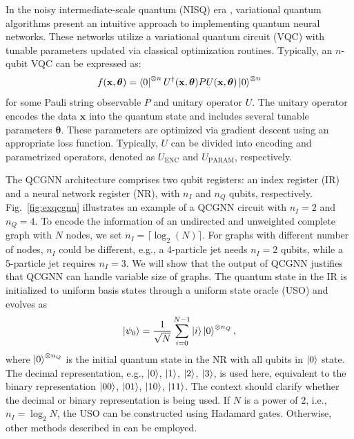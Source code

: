 \documentclass[reprint,amsmath,amssymb,prd,nofootinbib]{revtex4-2}
\def\xbf{\mathbf{x}}
\def\thetabf{\boldsymbol{\theta}}
\def\UENC{U_{\text{ENC}}}
\def\UPARAM{U_{\text{PARAM}}}
\begin{document}
In the noisy intermediate-scale quantum (NISQ) era \cite{nisq}, variational quantum algorithms \cite{vqc1,vqc2,vqc3} present an intuitive approach to implementing quantum neural networks. These networks utilize a variational quantum circuit (VQC) with tunable parameters updated via classical optimization routines. Typically, an $n$-qubit VQC can be expressed as:
\begin{equation*}
    f(\xbf,\thetabf) = \bra{0}^{\otimes n}U^\dagger(\xbf,\thetabf)PU(\xbf,\thetabf)\ket{0}^{\otimes n}
\end{equation*}
for some Pauli string observable $P$ and unitary operator $U$. The unitary operator encodes the data $\xbf$ into the quantum state and includes several tunable parameters $\thetabf$. These parameters are optimized via gradient descent \cite{psr1,psr2,psr3,psr4} using an appropriate loss function. Typically, $U$ can be divided into encoding and parametrized operators, denoted as $\UENC$ and $\UPARAM$, respectively.

The QCGNN architecture comprises two qubit registers: an index register (IR) and a neural network register (NR), with $n_I$ and $n_Q$ qubits, respectively. Fig.~\ref{fig:exqcgnn} illustrates an example of a QCGNN circuit with $n_I=2$ and $n_Q=4$. To encode the information of an undirected and unweighted complete graph with $N$ nodes, we set $n_I=\lceil \log_2(N)\rceil$. For graphs with different number of nodes, $n_I$ could be different, e.g., a 4-particle jet needs $n_I=2$ qubits, while a 5-particle jet requires $n_I=3$. We will show that the output of QCGNN justifies that QCGNN can handle variable size of graphs. The quantum state in the IR is initialized to uniform basis states through a uniform state oracle (USO) and evolves as
\begin{equation} \label{psi_0}
    \ket{\psi_0}=\frac{1}{\sqrt{N}}\sum^{N-1}_{i=0}\ket{i}\ket{0}^{\otimes n_Q}, 
\end{equation}
where $\ket{0}^{\otimes n_Q}$ is the initial quantum state in the NR with all qubits in $\ket{0}$ state. The decimal representation, e.g., $\ket{0}$, $\ket{1}$, $\ket{2}$, $\ket{3}$, is used here, equivalent to the binary representation $\ket{00}$, $\ket{01}$, $\ket{10}$, $\ket{11}$. The context should clarify whether the decimal or binary representation is being used. If $N$ is a power of 2, i.e., $n_I=\log_2 N$, the USO can be constructed using Hadamard gates. Otherwise, other methods described in \cite{uso1,uso2} can be employed.
\end{document}
